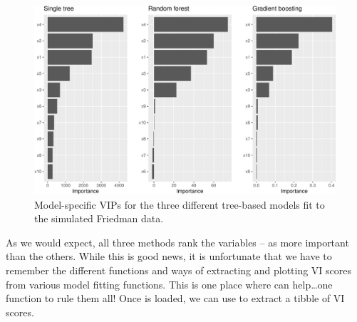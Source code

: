 \begin{Schunk}
\begin{figure}[!htb]

{\centering \includegraphics[width=1\linewidth]{greenwell-boehmke_files/figure-latex/vi-plots-1} 

}

\caption[Model-specific VIPs for the three different tree-based models fit to the simulated Friedman data]{Model-specific VIPs for the three different tree-based models fit to the simulated Friedman data.}\label{fig:vi-plots}
\end{figure}
\end{Schunk}

As we would expect, all three methods rank the variables
-- as more important than the others. While this is
good news, it is unfortunate that we have to remember the different
functions and ways of extracting and plotting VI scores from various
model fitting functions. This is one place where  can
help\ldots{}one function to rule them all! Once  is loaded, we
can use  to extract a tibble of VI scores.

